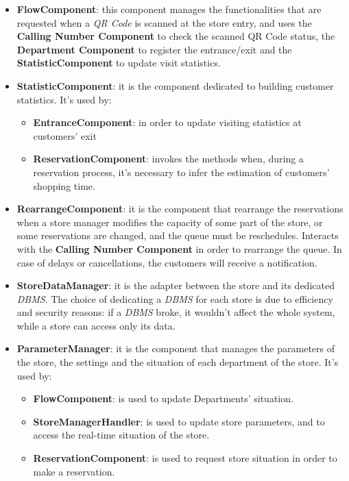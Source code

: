 \documentclass{article}
\begin{document}
			\begin{itemize}
				\item {\bfseries FlowComponent}: this component manages the functionalities that are requested when a \emph{QR Code} is scanned at the store entry, and uses the {\bfseries Calling Number Component} to check the scanned QR Code status, the {\bfseries Department Component} to register the entrance/exit and the {\bfseries StatisticComponent} to update visit statistics.
				
				\item {\bfseries StatisticComponent}: it is the component dedicated to building customer statistics. It’s used by:
				
				\begin{itemize}
					\item {\bfseries EntranceComponent}: in order to update visiting statistics at customers’ exit
					\item {\bfseries ReservationComponent}: invokes the methods when, during a reservation process, it’s necessary to infer the estimation of customers’ shopping time.
				\end{itemize}
			
				\item {\bfseries RearrangeComponent}: it is the component that rearrange the reservations when a store manager modifies the capacity of some part of the store, or some reservations are changed, and the queue must be reschedules. Interacts with the {\bfseries Calling Number Component} in order to rearrange the queue. In case of delays or cancellations, the customers will receive a notification.
				
				\item {\bfseries StoreDataManager}: it is the adapter between the store and its dedicated \emph{DBMS}. The choice of dedicating a \emph{DBMS} for each store is due to efficiency and security reasons: if a \emph{DBMS} broke, it wouldn't affect the whole system, while a store can access only its data.
				
				\item {\bfseries ParameterManager}: it is the component that manages the parameters of the store, the settings and the situation of each department of the store. It’s used by:
				
				\begin{itemize}
					\item {\bfseries FlowComponent}: is used to update Departments’ situation.
					\item {\bfseries StoreManagerHandler}: is used to update store parameters, and to access the real-time situation of the store.
					\item {\bfseries ReservationComponent}: is used to request store situation in order to make a reservation.
				\end{itemize}
			

\end{itemize}
\end{document}
